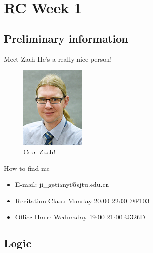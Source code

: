 \section{RC Week 1}
\subsection{Preliminary information}
\outline

\begin{frame}{Meet Zach}
He's a really nice person!
\begin{flushright}
    \begin{figure}[h]
        \includegraphics[width=3.2cm]{../images/Zach}
        \caption{Cool Zach!}
    \end{figure}
\end{flushright}
\end{frame}

\begin{frame}{How to find me}
\begin{itemize}
    \item E-mail: ji\_getianyi@sjtu.edu.cn
    \item Recitation Class: Monday 20:00-22:00 @F103
    \item Office Hour: Wednesday 19:00-21:00 @326D
\end{itemize}

\begin{flushright}
    \end{flushright}
\end{frame}

\subsection{Logic}
\outline

